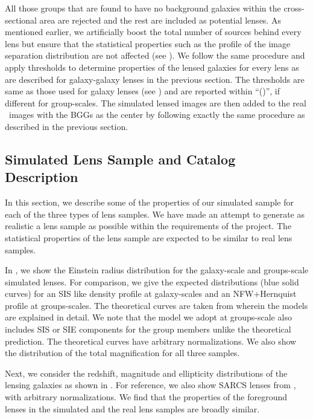 \documentclass[useAMS,usenatbib,a4paper]{mn2e}
\begin{document}
All those groups that are found to have no background galaxies within the
cross-sectional area are rejected and the rest are included as potential lenses.
As mentioned earlier, we artificially boost the total number of sources behind
every lens but ensure that the statistical properties such as the profile of the
image separation distribution are not affected (see ). We
follow the same procedure and apply thresholds to determine properties
of the lensed galaxies for every lens as are described for galaxy-galaxy lenses
in the previous section. The thresholds are same as those used for
galaxy lenses (see ) and are reported within ``()'', if
different for group-scales. The simulated lensed images are then added
to the real \cfhtls~images with the BGGs as the center by following
exactly the same procedure as described in the previous section.


\subsection{Simulated Lens Sample and Catalog Description}

In this section, we describe some of the properties of our simulated sample for
each of the three types of lens samples. We have made an attempt to
generate as realistic a lens sample as possible within the requirements
of the \sw project. The statistical properties of the lens sample are
expected to be similar to real lens samples.

In , we show the Einstein radius distribution for the
galaxy-scale and groups-scale simulated lenses. For comparison, we give
the expected distributions (blue solid curves) for an SIS like density
profile at galaxy-scales and an NFW+Hernquist profile at groups-scales.
The theoretical curves are taken from \citet{More2012} wherein the
models are explained in detail. We note that the model we adopt at
groups-scale also includes SIS or SIE components for the group members
unlike the theoretical prediction. The theoretical curves have arbitrary
normalizations. We also show the distribution of the total magnification
for all three samples.

Next, we consider the redshift, magnitude and ellipticity distributions
of the lensing galaxies as shown in . For reference,
we also show SARCS lenses from \citet{More2012}, with arbitrary
normalizations. We find that the properties of the foreground lenses in
the simulated and the real lens samples are broadly similar.
\end{document}
